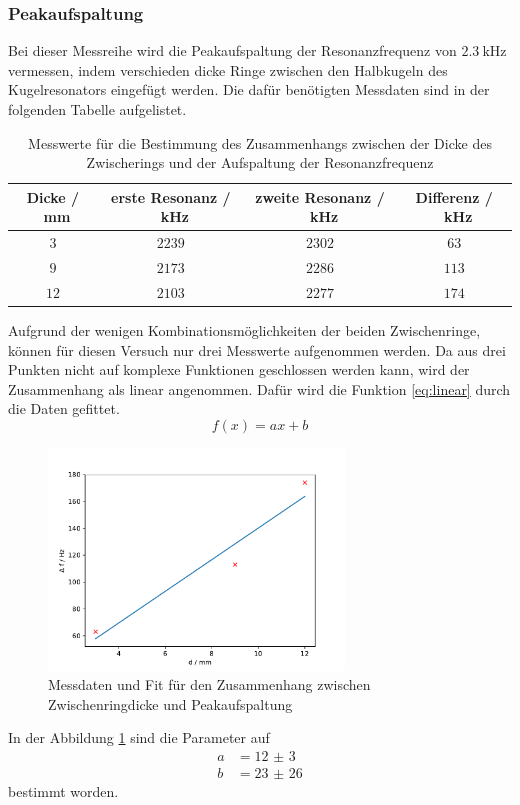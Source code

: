 \subsubsection{Peakaufspaltung}
Bei dieser Messreihe wird die Peakaufspaltung der Resonanzfrequenz von $\SI{2.3}{\kilo\hertz}$ vermessen, indem verschieden dicke 
Ringe zwischen den Halbkugeln des Kugelresonators eingefügt werden.
Die dafür benötigten Messdaten sind in der folgenden Tabelle  aufgelistet.
\FloatBarrier
\begin{table}
    \centering
    \caption{Messwerte für die Bestimmung des Zusammenhangs zwischen der Dicke des Zwischerings und der Aufspaltung der Resonanzfrequenz}
    \begin{tabular}{c c c c}
        \toprule
        Dicke / \SI{}{\milli\meter}& erste Resonanz / \SI{}{\kilo\hertz}& zweite Resonanz / \SI{}{\kilo\hertz}& Differenz / \SI{}{\kilo\hertz}\\
        \midrule
        $\num{3}$ &$\num{2239}$&$\num{2302}$&$\num{63}$\\
        $\num{9}$ &$\num{2173}$&$\num{2286}$&$\num{113}$\\
        $\num{12}$&$\num{2103}$&$\num{2277}$&$\num{174}$\\
        \bottomrule
    \end{tabular}
\end{table}
\FloatBarrier
Aufgrund der wenigen Kombinationsmöglichkeiten der beiden Zwischenringe, können für diesen Versuch nur drei Messwerte aufgenommen werden.
Da aus drei Punkten nicht auf komplexe Funktionen geschlossen werden kann, wird der Zusammenhang als linear angenommen.
Dafür wird die Funktion \eqref{eq:linear} durch die Daten gefittet.
\begin{equation}
    f\left(x\right) = ax +b
    \label{eq:linear}
\end{equation}
\FloatBarrier
\begin{figure}
    \centering
    \caption{Messdaten und Fit für den Zusammenhang zwischen Zwischenringdicke und Peakaufspaltung}
    \label{fig:Peakaufspaltung}
    \includegraphics[width=0.7\textwidth]{figure/Peak_Aufspaltung.pdf}
\end{figure}
\FloatBarrier
In der Abbildung \ref{fig:Peakaufspaltung} sind die Parameter auf 
\begin{align*}
    a&= \num{12(3)}\\
    b&= \num{23(26)}
\end{align*}
bestimmt worden.

